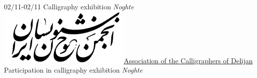 \documentclass[a4paper]{./classes/friggeri-cv}
\begin{document}
\begin{entrylist}
        \entry
        {02/11-02/11}
        {    Calligraphy exhibition \emph{Noghte}}
        {\href{http://calligraphers.ir/}{\includegraphics[scale=0.15]{../assets/images/logos/Khoshnevisan_logo.png}Association of the Calligraphers of Delijan}}
        {Participation in calligraphy exhibition \emph{Noghte}}
    \end{entrylist}
    \\
\end{document}
